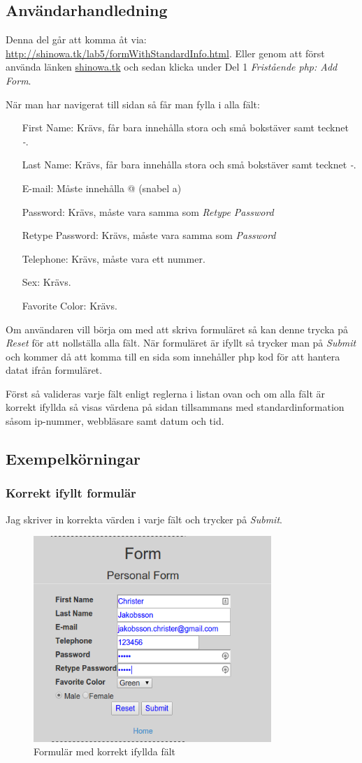 \documentclass[11pt, titlepage, oneside, a4paper]{article}
\newcommand{\Subsection}[1]{\vspace{-4pt}\subsection{#1}\vspace{-8pt}}
\newcommand{\Subsubsection}[1]{\vspace{-4pt}\subsubsection{#1}\vspace{-8pt}}
\begin{document}
		\Subsection{Användarhandledning}
		Denna del går att komma åt via:\\ \url{http://shinowa.tk/lab5/formWithStandardInfo.html}.
		Eller genom att först använda länken \url{shinowa.tk} och sedan klicka under Del 1 \emph{Fristående php: Add Form}.
		
		När man har navigerat till sidan så får man fylla i alla fält:
		\begin{itemize}
		 \item[First Name:] Krävs, får bara innehålla stora och små bokstäver samt tecknet \emph{-}.
		 \item[Last Name:] Krävs, får bara innehålla stora och små bokstäver samt tecknet \emph{-}.
		 \item[E-mail:] Måste innehålla @ (snabel a)
		 \item[Password:] Krävs, måste vara samma som \emph{Retype Password}
		 \item[Retype Password:] Krävs, måste vara samma som \emph{Password}
		 \item[Telephone:] Krävs, måste vara ett nummer.
		 \item[Sex:] Krävs.
		 \item[Favorite Color:] Krävs.
		\end{itemize}
		
		Om användaren vill börja om med att skriva formuläret så kan denne trycka på \emph{Reset} för att nollställa alla fält.
		När formuläret är ifyllt så trycker man på \emph{Submit} och kommer då att komma till en sida som innehåller php kod för att hantera datat ifrån formuläret.
		
		Först så valideras varje fält enligt reglerna i listan ovan och om alla fält är korrekt ifyllda så visas värdena på sidan tillsammans med standardinformation såsom ip-nummer, webbläsare samt datum och tid.
		\newpage
		\Subsection{Exempelkörningar}
		
		  \Subsubsection{Korrekt ifyllt formulär}
		  Jag skriver in korrekta värden i varje fält och trycker på \emph{Submit}.
		  \begin{figure}[h]
		  \centering
		  \includegraphics[width=90mm]{del1_formfilled.png}
		  \caption{Formulär med korrekt ifyllda fält}
		  \end{figure}
\end{document}
